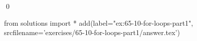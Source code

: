 
\begin{ex}
  \label{ex:65-10-for-loops-part1}
  
  \qed
\end{ex}
\begin{python0}
from solutions import *
add(label="ex:65-10-for-loops-part1",
    srcfilename='exercises/65-10-for-loops-part1/answer.tex')
\end{python0}
